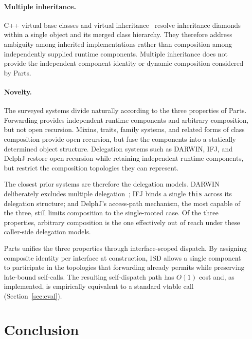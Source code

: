 \documentclass[acmsmall,nonacm]{acmart}
\theoremstyle{acmplain}
\newcommand{\code}[1]{\texttt{#1}}
\begin{document}
\paragraph{Multiple inheritance.}
C++ virtual base classes and virtual inheritance~\cite{stroustrup1987}
resolve inheritance diamonds within a single object and its merged class
hierarchy. They therefore address ambiguity among inherited implementations
rather than composition among independently supplied runtime components.
Multiple inheritance does not provide the independent component identity or
dynamic composition considered by Parts.

\paragraph{Novelty.}
The surveyed systems divide naturally according to the three properties of
Parts. Forwarding provides independent runtime components and arbitrary
composition, but not open recursion. Mixins, traits, family systems, and
related forms of class composition provide open recursion, but fuse the
components into a statically determined object structure. Delegation systems
such as DARWIN, IFJ, and DelphJ restore open recursion while retaining
independent runtime components, but restrict the composition topologies they
can represent.

The closest prior systems are therefore the delegation models. DARWIN
deliberately excludes multiple delegation~\cite[\S6.5.1]{kniesel2000}; IFJ
binds a single \code{this} across its delegation structure; and DelphJ's
access-path mechanism, the most capable of the three, still limits composition
to the single-rooted case. Of the three properties, arbitrary composition is
the one effectively out of reach under these caller-side delegation models.

Parts unifies the three properties through interface-scoped dispatch. By assigning composite identity per interface at construction,
ISD allows a single component to participate in the topologies that forwarding already permits while preserving late-bound
self-calls. The resulting self-dispatch path has $O(1)$ cost and, as implemented, is empirically equivalent to a standard
vtable call (Section~\ref{sec:eval}).

\section{Conclusion}
\end{document}
